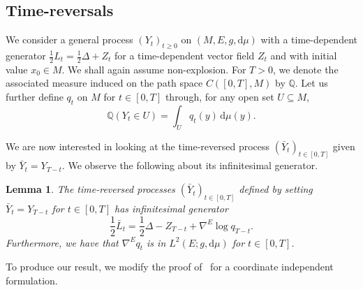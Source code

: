 \documentclass[10pt]{amsart}
\newcounter{dummy} \numberwithin{dummy}{section}
\newtheorem{lemma}[dummy]{Lemma}
\theoremstyle{remark}
\newcommand{\qq}{\mathbb{Q}}
\newcommand{\dd}{\,{\mathrm d}}
\newcommand{\db}{{\mathrm d}}
\numberwithin{equation}{section}
\begin{document}
\subsection{Time-reversals} \label{sec:TimeReversals}
We consider a general process $(Y_t)_{t\geq 0}$ on $(M,E,g,\db\mu)$ with a time-dependent generator $\frac{1}{2}L_t = \frac{1}{2}\Delta + Z_t$ for a time-dependent vector field $Z_t$ and with initial value $x_0\in M$. We shall again assume non-explosion. For $T>0$, we denote the associated measure induced on the path space $C([0,T],M)$ by $\qq$. Let us further define $q_t$ on $M$ for $t\in [0,T]$ through, for any open set $U\subseteq M$,
\begin{equation}\label{eq:bridgedensity}
    \qq(Y_t \in U) = \int_U q_t(y) \dd \mu(y).
\end{equation}

We are now interested in looking at the time-reversed process $(\bar{Y}_t)_{t\in[0,T]}$ given by $\bar{Y}_t = Y_{T-t}$. We observe the following about its infinitesimal generator.
\begin{lemma} \label{lemma:Denoise}
The time-reversed processes $(\bar{Y}_t)_{t\in[0,T]}$ defined by setting $\bar{Y}_t = Y_{T-t}$ for $t\in[0,T]$ has infinitesimal generator
\begin{displaymath}
    \frac{1}{2}\bar{L}_t = \frac{1}{2}\Delta  - Z_{T-t} + \nabla^E \log q_{T-t}.
\end{displaymath}
Furthermore, we have that $\nabla^E q_t$ is in $L^2(E; g,\db\mu)$ for $t\in[0,T]$.
\end{lemma}
To produce our result, we modify the proof of~\cite[Theorem~2.1]{haussmann1986time} for a coordinate independent formulation.
\end{document}
